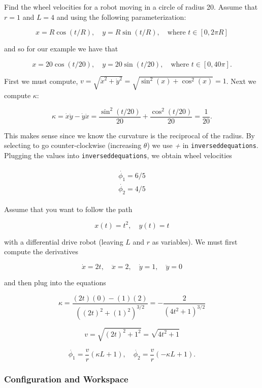 Find the wheel velocities for a robot moving in a circle of radius 20.
Assume that \(r=1\) and \(L = 4\) and using the following
parameterization:

\[x = R\cos(t/R), \quad y = R\sin(t/R), \quad \mbox{where } t \in [0, 2\pi R]\]

and so for our example we have that

\[x = 20\cos(t/20), \quad y = 20\sin(t/20), \quad \mbox{where } t \in [0, 40\pi].\]

First we must compute,
\(v = \sqrt{\dot{x}^2 + \dot{y}^2} =  \sqrt{\sin^2(x) + \cos^2(x)} =1\).
Next we compute \(\kappa\):

\[\kappa =  \dot{x}\ddot{y} - \dot{y}\ddot{x} =
\frac{\sin^2(t/20)}{20} + \frac{\cos^2(t/20)}{20}  =  \frac{1}{20} .\]

This makes sense since we know the curvature is the reciprocal of the
radius. By selecting to go counter-clockwise (increasing \(\theta\)) we
use \emph{+} in \texttt{inverseddequations}. Plugging the values into
\texttt{inverseddequations}, we obtain wheel velocities

\[\begin{aligned}
\begin{array}{l}
\dot{\phi_1} = 6/5 \\[3mm]
\dot{\phi_2} = 4/5
\end{array}
\end{aligned}\]

Assume that you want to follow the path

\[x(t) = t^2, \quad y(t) = t\]

with a differential drive robot (leaving \(L\) and \(r\) as variables).
We must first compute the derivatives

\[\dot{x} = 2t,\quad \ddot{x} = 2,\quad \dot{y} = 1,\quad \ddot{y} = 0\]

and then plug into the equations

\[\kappa = \frac{(2t)(0) - (1)(2)}{\left((2t)^2 + (1)^2\right)^{3/2}} = -\frac{2}{\left(4t^2 + 1\right)^{3/2}}\]

\[v = \sqrt{(2t)^2 + 1^2} = \sqrt{4t^2 + 1}\]

\[\dot{\phi_1} =  \frac{v}{r}\left( \kappa L + 1\right) , \quad \dot{\phi_2} = \frac{v}{r}\left( - \kappa L  + 1\right).\]

\hypertarget{configuration-and-workspace}{%
\subsubsection{Configuration and
Workspace}\label{configuration-and-workspace}}


